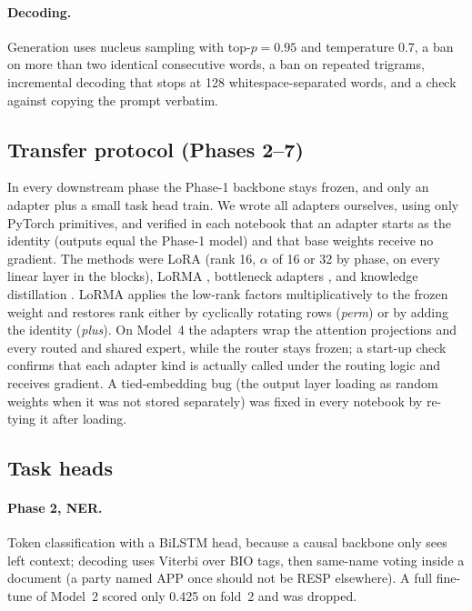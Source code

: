 \documentclass[11pt, oneside]{article}
\begin{document}
\paragraph{Decoding.} Generation uses nucleus sampling \cite{holtzman2020nucleus} with top-$p=0.95$ and temperature 0.7, a ban on more than two identical consecutive words, a ban on repeated trigrams, incremental decoding that stops at 128 whitespace-separated words, and a check against copying the prompt verbatim.

\subsection{Transfer protocol (Phases 2--7)}
In every downstream phase the Phase-1 backbone stays frozen, and only an adapter plus a small task head train. We wrote all adapters ourselves, using only PyTorch primitives, and verified in each notebook that an adapter starts as the identity (outputs equal the Phase-1 model) and that base weights receive no gradient. The methods were LoRA \cite{hu2022lora} (rank 16, $\alpha$ of 16 or 32 by phase, on every linear layer in the blocks), LoRMA \cite{bihany2025lorma}, bottleneck adapters \cite{houlsby2019adapters}, and knowledge distillation \cite{hinton2015distilling}. LoRMA applies the low-rank factors multiplicatively to the frozen weight and restores rank either by cyclically rotating rows (\emph{perm}) or by adding the identity (\emph{plus}). On Model~4 the adapters wrap the attention projections and every routed and shared expert, while the router stays frozen; a start-up check confirms that each adapter kind is actually called under the routing logic and receives gradient. A tied-embedding bug (the output layer loading as random weights when it was not stored separately) was fixed in every notebook by re-tying it after loading.

\subsection{Task heads}
\paragraph{Phase 2, NER.} Token classification with a BiLSTM head, because a causal backbone only sees left context; decoding uses Viterbi over BIO tags, then same-name voting inside a document (a party named APP once should not be RESP elsewhere). A full fine-tune of Model~2 scored only 0.425 on fold~2 and was dropped.
\end{document}
